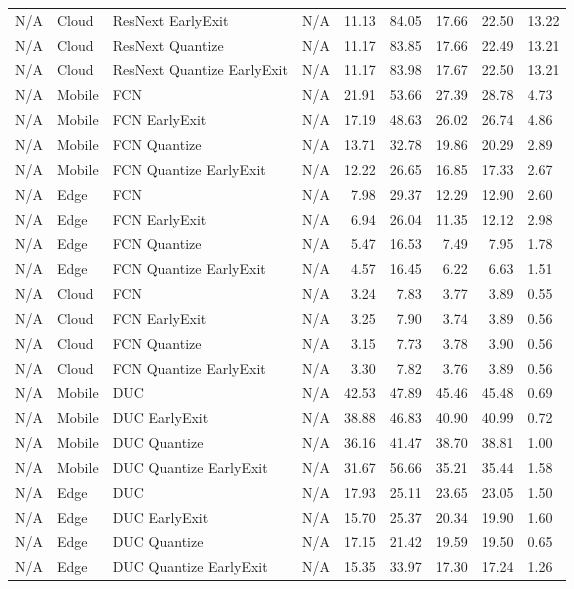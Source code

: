 \begin{tabular}{|l|l|l|l|r|r|r|r|}
N/A & Cloud & ResNext EarlyExit & N/A & 11.13 & 84.05 & 17.66 & 22.50 & 13.22 \\
N/A & Cloud & ResNext Quantize & N/A & 11.17 & 83.85 & 17.66 & 22.49 & 13.21 \\
N/A & Cloud & ResNext Quantize EarlyExit & N/A & 11.17 & 83.98 & 17.67 & 22.50 & 13.21 \\
N/A & Mobile & FCN & N/A & 21.91 & 53.66 & 27.39 & 28.78 & 4.73 \\
N/A & Mobile & FCN EarlyExit & N/A & 17.19 & 48.63 & 26.02 & 26.74 & 4.86 \\
N/A & Mobile & FCN Quantize & N/A & 13.71 & 32.78 & 19.86 & 20.29 & 2.89 \\
N/A & Mobile & FCN Quantize EarlyExit & N/A & 12.22 & 26.65 & 16.85 & 17.33 & 2.67 \\
N/A & Edge & FCN & N/A & 7.98 & 29.37 & 12.29 & 12.90 & 2.60 \\
N/A & Edge & FCN EarlyExit & N/A & 6.94 & 26.04 & 11.35 & 12.12 & 2.98 \\
N/A & Edge & FCN Quantize & N/A & 5.47 & 16.53 & 7.49 & 7.95 & 1.78 \\
N/A & Edge & FCN Quantize EarlyExit & N/A & 4.57 & 16.45 & 6.22 & 6.63 & 1.51 \\
N/A & Cloud & FCN & N/A & 3.24 & 7.83 & 3.77 & 3.89 & 0.55 \\
N/A & Cloud & FCN EarlyExit & N/A & 3.25 & 7.90 & 3.74 & 3.89 & 0.56 \\
N/A & Cloud & FCN Quantize & N/A & 3.15 & 7.73 & 3.78 & 3.90 & 0.56 \\
N/A & Cloud & FCN Quantize EarlyExit & N/A & 3.30 & 7.82 & 3.76 & 3.89 & 0.56 \\
N/A & Mobile & DUC & N/A & 42.53 & 47.89 & 45.46 & 45.48 & 0.69 \\
N/A & Mobile & DUC EarlyExit & N/A & 38.88 & 46.83 & 40.90 & 40.99 & 0.72 \\
N/A & Mobile & DUC Quantize & N/A & 36.16 & 41.47 & 38.70 & 38.81 & 1.00 \\
N/A & Mobile & DUC Quantize EarlyExit & N/A & 31.67 & 56.66 & 35.21 & 35.44 & 1.58 \\
N/A & Edge & DUC & N/A & 17.93 & 25.11 & 23.65 & 23.05 & 1.50 \\
N/A & Edge & DUC EarlyExit & N/A & 15.70 & 25.37 & 20.34 & 19.90 & 1.60 \\
N/A & Edge & DUC Quantize & N/A & 17.15 & 21.42 & 19.59 & 19.50 & 0.65 \\
N/A & Edge & DUC Quantize EarlyExit & N/A & 15.35 & 33.97 & 17.30 & 17.24 & 1.26 \\

\end{tabular}
